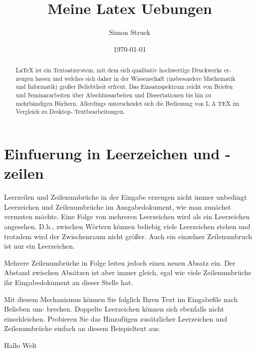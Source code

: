 \documentclass[a4paper,twoside,10pt]{article}
\title{Meine Latex Uebungen}
\author{Simon Struck}
\date{\today}
\begin{document}
	\maketitle
	\newpage
	\tableofcontents
	\newpage
	
	\section{Einfuerung in Leerzeichen und -zeilen}
	Leerzeilen und Zeilenumbrüche in der Eingabe erzeugen nicht immer unbedingt Leerzeichen
	und Zeilenumbrüche im Ausgabedokument, wie man zunächst vermuten möchte. Eine Folge von mehreren Leerzeichen wird als ein Leerzeichen angesehen. D.h., zwischen Wörtern können beliebig viele Leerzeichen stehen und trotzdem wird der Zwischenraum nicht größer. Auch ein
	einzelner Zeilenumbruch ist nur ein Leerzeichen.
	
	
	Mehrere Zeilenumbrüche in Folge leiten jedoch einen neuen Absatz ein. Der Abstand zwischen
	Absätzen ist aber immer gleich, egal wie viele Zeilenumbrüche ihr Eingabedokument an dieser
	Stelle hat.
	
	
	Mit diesem Mechanismus können Sie folglich Ihren Text im Eingabefile nach Belieben um-
	brechen. Doppelte Leerzeichen können sich ebenfalls nicht einschleichen. Probieren Sie das
	Hinzufügen zusätzlicher Leerzeichen und Zeilenumbrüche einfach an diesem Beispieltext aus.
	\newpage
	
	\begin{abstract}
		LaTeX ist ein Textsatzsystem, mit dem sich qualitativ hochwertige Druckwerke er-
		zeugen lassen und welches sich daher in der Wissenschaft (insbesondere Mathematik
		und Informatik) großer Beliebtheit erfreut. Das Einsatzspektrum reicht von Briefen und
		Seminararbeiten über Abschlussarbeiten und Dissertationen bis hin zu mehrbändigen
		Büchern. Allerdings unterscheidet sich die Bedienung von L A TEX im Vergleich zu Desktop-
		Textbearbeitungen.
	\end{abstract}
	
	
	Hallo Welt
\end{document}
